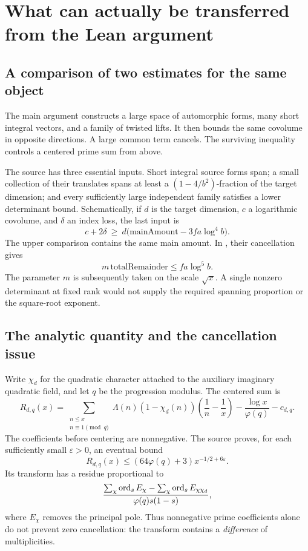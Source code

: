 \section{What can actually be transferred from the Lean argument}
\label{sec:source}

\subsection{A comparison of two estimates for the same object}
The main argument constructs a large space of automorphic forms, many short integral vectors, and a family of twisted lifts. It then bounds the same covolume in opposite directions. A large common term cancels. The surviving inequality controls a centered prime sum from above.

The source has three essential inputs. Short integral source forms span; a small collection of their translates spans at least a \((1-4/b^2)\)-fraction of the target dimension; and every sufficiently large independent family satisfies a lower determinant bound. Schematically, if \(d\) is the target dimension, \(c\) a logarithmic covolume, and \(\delta\) an index loss, the last input is
\[
 c+2\delta\ \ge\
 d\bigl(\mathrm{mainAmount}-3fa\log^4 b\bigr).
\]
The upper comparison contains the same main amount. In
,
their cancellation gives
\[
 m\,\mathrm{totalRemainder}\le fa\log^5 b.
\]
The parameter \(m\) is subsequently taken on the scale \(\sqrt{x}\). A single nonzero determinant at fixed rank would not supply the required spanning proportion or the square-root exponent.

\subsection{The analytic quantity and the cancellation issue}
Write \(\chi_d\) for the quadratic character attached to the auxiliary imaginary quadratic field, and let \(q\) be the progression modulus. The centered sum is
\[
 R_{d,q}(x)=
 \sum_{\substack{n\le x\\n\equiv1\pmod q}}
 \Lambda(n)(1-\chi_d(n))
 \left(\frac1n-\frac1x\right)
 -\frac{\log x}{\varphi(q)}-c_{d,q}.
\]
The coefficients before centering are nonnegative. The source proves, for each sufficiently small \(\varepsilon>0\), an eventual bound
\[
 R_{d,q}(x)\le (64\varphi(q)+3)x^{-1/2+6\varepsilon}.
\]
Its transform has a residue proportional to
\[
 \frac{
 \sum_\chi\operatorname{ord}_s E_\chi-\sum_\chi\operatorname{ord}_s E_{\chi\chi_d}
 }{\varphi(q)s(1-s)},
\]
where \(E_\chi\) removes the principal pole. Thus nonnegative prime coefficients alone do not prevent zero cancellation: the transform contains a \emph{difference} of multiplicities.

